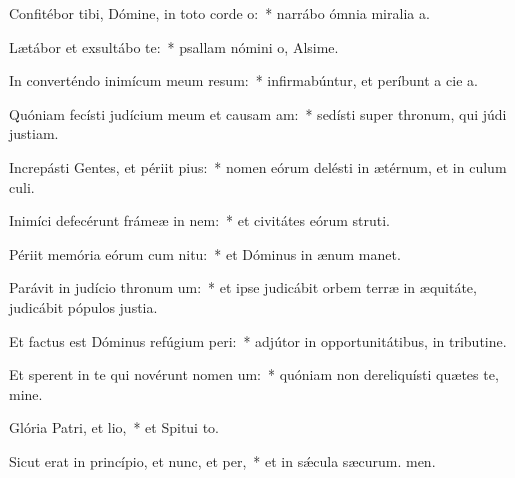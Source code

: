 \item Confitébor tibi, Dómine, in toto corde o:~* narrábo ómnia miralia a.
\item Lætábor et exsultábo  te:~* psallam nómini o, Alsime.
\item In converténdo inimícum meum resum:~* infirmabúntur, et períbunt a cie a.
\item Quóniam fecísti judícium meum et causam am:~* sedísti super thronum, qui júdi justiam.
\item Increpásti Gentes, et périit pius:~* nomen eórum delésti in ætérnum, et in culum culi.
\item Inimíci defecérunt frámeæ in nem:~* et civitátes eórum struti.
\item Périit memória eórum cum nitu:~* et Dóminus in ænum manet.
\item Parávit in judício thronum um:~* et ipse judicábit orbem terræ in æquitáte, judicábit pópulos  justia.
\item Et factus est Dóminus refúgium peri:~* adjútor in opportunitátibus, in tributine.
\item Et sperent in te qui novérunt nomen um:~* quóniam non dereliquísti quætes te, mine.
\item Glória Patri, et lio,~* et Spitui to.
\item Sicut erat in princípio, et nunc, et per,~* et in sǽcula sæcurum. men.
